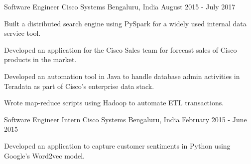 \begin{cventries}
  \cventry
    {Software Engineer}
    {Cisco Systems}
    {Bengaluru, India}
    {August 2015 - July 2017}
    {
      \begin{cvitems}
        \item {Built a distributed search engine using PySpark for a widely used internal data service tool.}
        \item {Developed an application for the Cisco Sales team for forecast sales of Cisco products in the market.}
        \item {Developed an automation tool in Java to handle database admin activities in Teradata as part of Cisco's enterprise data stack.}
        \item{Wrote map-reduce scripts using Hadoop to automate ETL transactions.}
      \end{cvitems}
    }
    \cventry
    {Software Engineer Intern}
    {Cisco Systems}
    {Bengaluru, India}
    {February 2015 - June 2015}
    {
    \begin{cvitems}
    \item{Developed an application to capture customer sentiments in Python using Google's Word2vec model.}
    \end{cvitems}
    }
    
\end{cventries}


